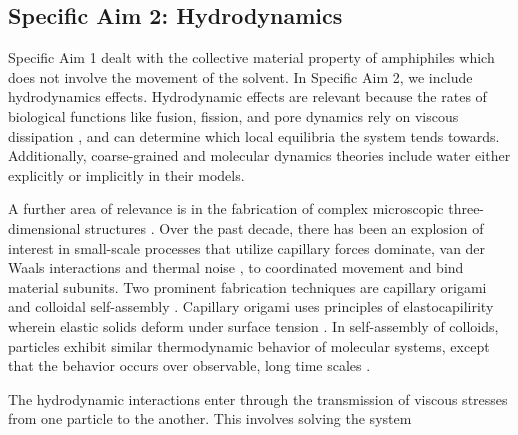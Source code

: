 \subsection{Specific Aim 2: Hydrodynamics}
\label{subsec:specific_aim_2}
Specific Aim 1 dealt with the collective material property of amphiphiles which does not involve the movement  of the solvent.
In Specific Aim 2, we include hydrodynamics effects. Hydrodynamic effects are relevant
because the rates of biological functions like fusion, fission, and pore dynamics rely on viscous dissipation \cite{RYHAM20112929},
and can determine which local equilibria the system tends towards. 
Additionally, coarse-grained and molecular dynamics theories include water either explicitly or implicitly in their models. 

A further area of relevance is in the fabrication of complex microscopic three-dimensional structures \cite{Cho2010}.
Over the past decade, there has been an explosion of interest in small-scale processes that utilize capillary forces dominate,  van der Waals interactions and thermal noise  \cite{Zhang2017},
to coordinated movement and bind  material subunits. Two prominent fabrication techniques are capillary origami 
\cite{Pandey2011,Leong2007,Reynolds2019} and colloidal self-assembly \cite{Dasgupta2017,Siontorou2017}. Capillary origami uses principles of elastocapilirity wherein elastic solids deform under surface tension \cite{Bico2018,VanHonschoten2010}. In self-assembly of colloids, 
particles exhibit similar thermodynamic behavior of molecular systems, except that the behavior occurs over observable, long time scales \cite{Zhang2017}. 

The hydrodynamic interactions enter through the transmission of viscous stresses from one particle to the another.
This involves solving the system 

\setcounter{midequation}{\theequation}
\addtocounter{midequation}{2}

